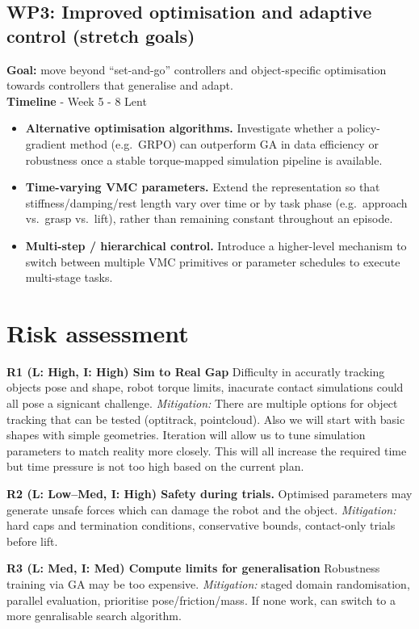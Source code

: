 \documentclass[12pt,a4paper,twocolumn]{article}
\begin{document}
\subsection{WP3: Improved optimisation and adaptive control (stretch goals)}
\textbf{Goal:} move beyond ``set-and-go'' controllers and object-specific optimisation towards controllers that generalise and adapt. \\
\textbf{Timeline} - Week 5 - 8 Lent
\begin{itemize}
    \item \textbf{Alternative optimisation algorithms.} Investigate whether a policy-gradient method (e.g.\ GRPO) can outperform GA in data efficiency or robustness once a stable torque-mapped simulation pipeline is available.
    \item \textbf{Time-varying VMC parameters.} Extend the representation so that stiffness/damping/rest length vary over time or by task phase (e.g.\ approach vs.\ grasp vs.\ lift), rather than remaining constant throughout an episode.
    \item \textbf{Multi-step / hierarchical control.} Introduce a higher-level mechanism to switch between multiple VMC primitives or parameter schedules to execute multi-stage tasks.
\end{itemize}


\section{Risk assessment}

\noindent\textbf{R1 (L: High, I: High) Sim to Real Gap}
Difficulty in accuratly tracking objects pose and shape, robot torque limits, inacurate contact simulations could all pose a signicant challenge.
\emph{Mitigation:} There are multiple options for object tracking that can be tested (optitrack, pointcloud). Also we will start with basic shapes with simple geometries. Iteration will allow us to tune simulation parameters to match reality more closely. This will all increase the required time but time pressure is not too high based on the current plan.

\noindent\textbf{R2 (L: Low--Med, I: High) Safety during trials.}
Optimised parameters may generate unsafe forces which can damage the robot and the object.
\emph{Mitigation:} hard caps and termination conditions, conservative bounds, contact-only trials before lift.

\noindent\textbf{R3 (L: Med, I: Med) Compute limits for generalisation}
Robustness training via GA may be too expensive.
\emph{Mitigation:} staged domain randomisation, parallel evaluation, prioritise pose/friction/mass. If none work, can switch to a more genralisable search algorithm.
\end{document}
